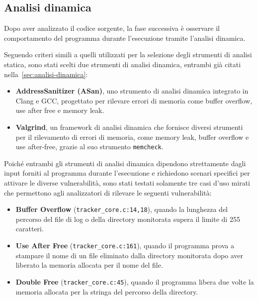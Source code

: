 \subsection*{Analisi dinamica}
Dopo aver analizzato il codice sorgente, la fase successiva è osservare il
comportamento del programma durante l'esecuzione tramite l'analisi dinamica.

Seguendo criteri simili a quelli utilizzati per la selezione degli strumenti di
analisi statica, sono stati scelti due strumenti di analisi dinamica, entrambi
già citati nella~\autoref{sec:analisi-dinamica}:
\begin{itemize}
  \item \textbf{AddressSanitizer (ASan)}, uno strumento di analisi dinamica integrato
    in Clang e GCC, progettato per rilevare errori di memoria come buffer
    overflow, use after free e memory leak.

  \item \textbf{Valgrind}, un framework di analisi dinamica che fornisce diversi
    strumenti per il rilevamento di errori di memoria, come memory leak, buffer overflow
    e use after-free, grazie al suo strumento \texttt{memcheck}.
\end{itemize}

\noindent
Poiché entrambi gli strumenti di analisi dinamica dipendono strettamente dagli
input forniti al programma durante l'esecuzione e richiedono scenari specifici
per attivare le diverse vulnerabilità, sono stati testati solamente tre casi d'uso
mirati che permettono agli analizzatori di rilevare le seguenti vulnerabilità:
\begin{itemize}
  \item \textbf{Buffer Overflow} (\texttt{tracker\_core.c:14,18}), quando la
    lunghezza del percorso del file di log o della directory monitorata supera
    il limite di 255 caratteri.

  \item \textbf{Use After Free} (\texttt{tracker\_core.c:161}), quando il
    programma prova a stampare il nome di un file eliminato dalla directory
    monitorata dopo aver liberato la memoria allocata per il nome del file.

  \item \textbf{Double Free} (\texttt{tracker\_core.c:45}), quando il programma
    libera due volte la memoria allocata per la stringa del percorso della
    directory.
\end{itemize}

